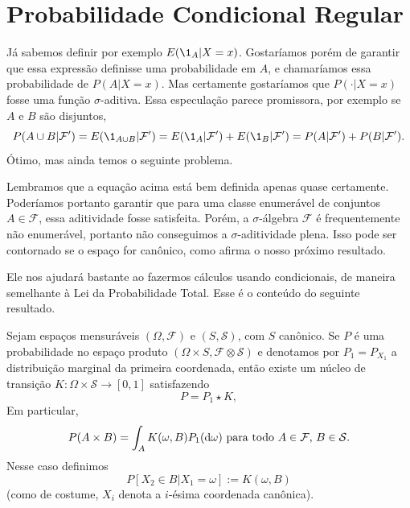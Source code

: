 


\section{Probabilidade Condicional Regular}

Já sabemos definir por exemplo $E(\1_A|X = x)$.
Gostaríamos porém de garantir que essa expressão definisse uma probabilidade em $A$, e chamaríamos essa probabilidade de $P(A|X = x)$.
Mas certamente gostaríamos que $P(\cdot|X = x)$ fosse uma função $\sigma$-aditiva.
Essa especulação parece promissora, por exemplo se $A$ e $B$ são disjuntos,
\begin{equation*}
  P(A \cup B |\mathcal{F}') = E(\1_{A \cup B} | \mathcal{F}') = E(\1_A|\mathcal{F}') + E(\1_{B}|\mathcal{F}') = P(A|\mathcal{F}') + P(B|\mathcal{F}').
\end{equation*}
Ótimo, mas ainda temos o seguinte problema.

Lembramos que a equação acima está bem definida apenas quase certamente.
Poderíamos portanto garantir que para uma classe enumerável de conjuntos $A \in \mathcal{F}$, essa aditividade fosse satisfeita.
Porém, a $\sigma$-álgebra $\mathcal{F}$ é frequentemente não enumerável, portanto não conseguimos a $\sigma$-aditividade plena.
Isso pode ser contornado se o espaço for canônico, como afirma o nosso próximo resultado.

Ele nos ajudará bastante ao fazermos cálculos usando condicionais, de maneira semelhante à Lei da Probabilidade Total.
Esse é o conteúdo do seguinte resultado.

\begin{theorem} 
  \label{desintegracao}
  Sejam espaços mensuráveis $(\Omega, \mathcal{F})$ e $(S, \mathcal{S})$, com $S$ canônico.
  Se $P$ é uma probabilidade no espaço produto $(\Omega \times S, \mathcal{F} \otimes \mathcal{S})$ e denotamos por $P_1 = P_{X_1}$ a
  distribuição marginal da primeira coordenada, então existe um núcleo de transição $K: \Omega \times \mathcal{S} \to [0,1]$ satisfazendo
  \begin{equation}
    P = P_1 \star K,
  \end{equation}
  Em particular,
  \begin{equation}
    \label{e:prob_cond_reg_prod}
    P(A \times B) = \int_A K(\omega, B) P_1 (\mathop{}\!\mathrm{d} \omega) \text{ para todo $A \in \mathcal{F}$, $B \in \mathcal{S}$}.
  \end{equation}
  Nesse caso definimos
  $$P[X_2 \in B | X_1 = \omega]:=K(\omega, B)$$
  (como de costume, $X_i$ denota a $i$-ésima coordenada canônica).
\end{theorem}

